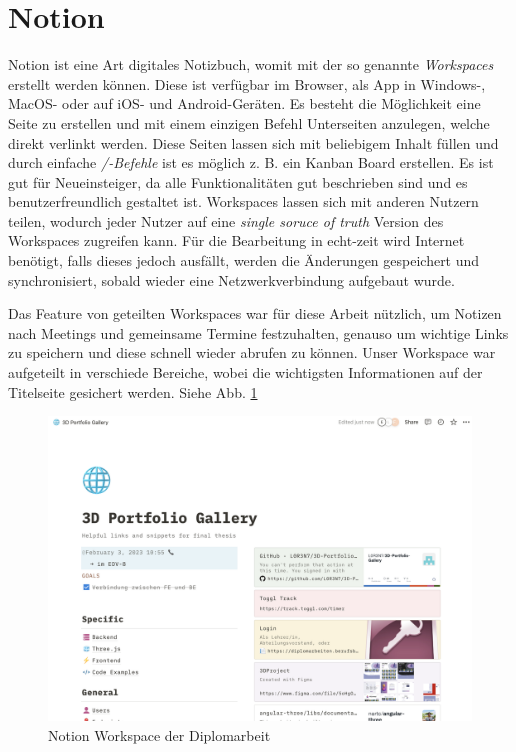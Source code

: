 \section{Notion}
Notion ist eine Art digitales Notizbuch, womit mit der so genannte \emph{Workspaces} erstellt werden können. 
Diese ist verfügbar im Browser, als App in Windows-, MacOS- oder auf iOS- und Android-Geräten. 
Es besteht die Möglichkeit eine Seite zu erstellen und mit einem einzigen Befehl Unterseiten anzulegen, welche direkt verlinkt werden.
Diese Seiten lassen sich mit beliebigem Inhalt füllen und durch einfache \emph{/-Befehle} ist es möglich z. B. ein Kanban Board erstellen. 
Es ist gut für Neueinsteiger, da alle Funktionalitäten gut beschrieben sind und es benutzerfreundlich gestaltet ist.
Workspaces lassen sich mit anderen Nutzern teilen, wodurch jeder Nutzer auf eine \emph{single soruce of truth} Version des Workspaces zugreifen kann.
Für die Bearbeitung in echt-zeit wird Internet benötigt, falls dieses jedoch ausfällt, werden die Änderungen gespeichert und synchronisiert, sobald wieder eine Netzwerkverbindung aufgebaut wurde.
\cite{NotionAbout}

Das Feature von geteilten Workspaces war für diese Arbeit nützlich, um Notizen nach Meetings und gemeinsame Termine festzuhalten, genauso um wichtige Links zu speichern und diese schnell wieder abrufen zu können.
Unser Workspace war aufgeteilt in verschiede Bereiche, wobei die wichtigsten Informationen auf der Titelseite gesichert werden. Siehe Abb. \ref{fig:tech:notion-page}  

\begin{figure} [h t]
  \centering
  \includegraphics[scale=0.3]{pics/NotionPage.png}
  \caption{Notion Workspace der Diplomarbeit}
  \label{fig:tech:notion-page}
\end{figure}

